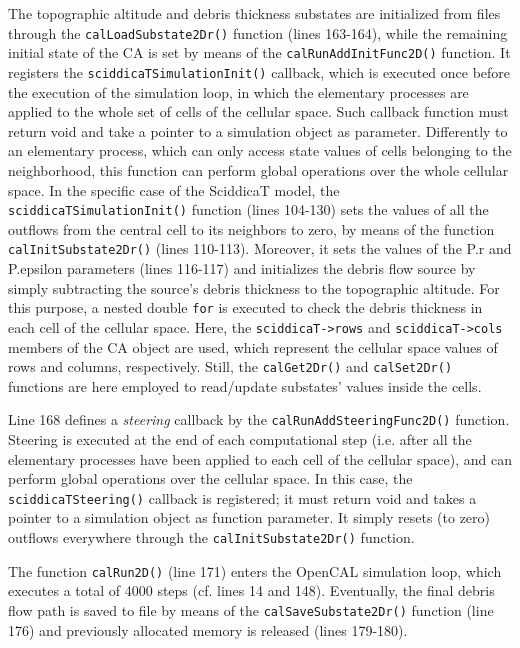 The topographic altitude and debris thickness substates are
initialized from files through the \verb'calLoadSubstate2Dr()'
function (lines 163-164), while the remaining initial state of the CA
is set by means of the \verb'calRunAddInitFunc2D()' function. It
registers the \verb'sciddicaTSimulationInit()' callback, which is
executed once before the execution of the simulation loop, in which
the elementary processes are applied to the whole set of cells of the
cellular space. Such callback function must return void and take a
pointer to a simulation object as parameter. Differently to an
elementary process, which can only access state values of cells
belonging to the neighborhood, this function can perform global
operations over the whole cellular space. In the specific case of the
SciddicaT model, the \verb'sciddicaTSimulationInit()' function
(lines 104-130) sets the values of all the outflows from the central
cell to its neighbors to zero, by means of the function
\verb'calInitSubstate2Dr()' (lines 110-113). Moreover, it sets the
values of the P.r and P.epsilon parameters (lines 116-117) and
initializes the debris flow source by simply subtracting the source's
debris thickness to the topographic altitude. For this purpose, a
nested double \verb'for' is executed to check the debris thickness in each
cell of the cellular space. Here, the \verb'sciddicaT->rows' and
\verb'sciddicaT->cols' members of the CA object are used, which
represent the cellular space values of rows and columns,
respectively. Still, the \verb'calGet2Dr()' and \verb'calSet2Dr()'
functions are here employed to read/update substates' values inside
the cells.

Line 168 defines a \emph{steering} callback by
the \verb'calRunAddSteeringFunc2D()' function. Steering is executed at
the end of each computational step (i.e. after all the elementary
processes have been applied to each cell of the cellular space), and
can perform global operations over the cellular space. In this case,
the \verb'sciddicaTSteering()' callback is registered; it must
return void and takes a pointer to a simulation object as function
parameter. It simply resets (to zero) outflows everywhere through
the \verb'calInitSubstate2Dr()' function.

The function \verb'calRun2D()' (line 171) enters the OpenCAL
simulation loop, which executes a total of 4000 steps (cf. lines 14
and 148). Eventually, the final debris flow path is saved to file by
means of the \verb'calSaveSubstate2Dr()' function (line 176) and
previously allocated memory is released (lines 179-180).

